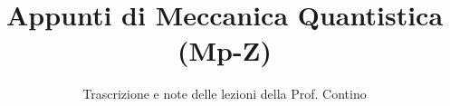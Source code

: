 \documentclass[a4paper,12pt]{article}
\title{Appunti di Meccanica Quantistica (Mp-Z)}
\author{Trascrizione e note delle lezioni della Prof. Contino}
\date{}
\begin{document}
\maketitle
\projectintro
\tableofcontents
\newpage

\end{document}
